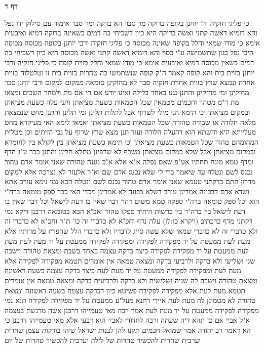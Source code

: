 \documentclass[12pt, openany]{book}
\newcommand{\sethebfont}{
\fontsize{10.5pt}{21.0pt} \selectfont
}
\newcommand{\twocol}[1]{
	{\sethebfont \begin{multicols}{2}
			#1
	\end{multicols}}	
}
\newcommand{\sectname}{}
\newcommand{\newsection}[1]{
	\addcontentsline{toc}{section}{#1}
	\renewcommand{\sectname}{#1}	
	\vspace{-\baselineskip}
	\begin{center}
		\textbf{%
\fontsize{16pt}{16pt}\selectfont
			#1}
	\end{center}
	\vspace{-\baselineskip}
	\nopagebreak
}
\begin{document}
\newsection{דף ד}
\twocol{כי פליגי חזקיה ור' יוחנן בקופה בדוקה  מר סבר  הא בדקה  ומר סבר  אימור עם סילוק ידו נפל 
והא דומיא דאשה קתני ואשה בדוקה היא  כיון דשכיחי בה דמים כשאינה בדוקה דמיא 
ואיבעית אימא  כי מודו שמאי והלל בקופה שאינה מכוסה כי פליגי חזקיה ורבי יוחנן בקופה מכוסה  מכוסה היכי נפל  כגון שתשמישה ע"י כסוי 
והא דומיא דאשה קתני ואשה מכוסה היא  כיון דשכיחי בה דמים כשאין מכוסה דמיא 
ואיבעית אימא  כי מודו שמאי והלל בזוית קופה כי פליגי חזקיה ורבי יוחנן בזוית בית  והא קופה קאמר 
ה"ק  קופה שנשתמשו בה טהרות בזוית בית זו וטלטלוה בזוית אחרת ונמצא שרץ בזוית אחרת  חזקיה סבר  לא מחזקינן טומאה ממקום למקום ורבי יוחנן סבר  מחזקינן 
ומי מחזקינן  והתנן  נגע באחד בלילה ואינו יודע אם חי אם מת ולמחר השכים ומצאו מת ר"מ מטהר
וחכמים מטמאין שכל הטמאות כשעת מציאתן 
ותני עלה  כשעת מציאתן ובמקום מציאתן 
וכי תימא  הני מילי לשרוף אבל לתלות תלינן  ומי תלינן 
והתנן  מחט שנמצאת מלאה חלודה או שבורה טהורה שכל הטמאות כשעת מציאתן  ואמאי  לימא  האי מעיקרא מחט מעלייתא היא והשתא הוא דהעלה חלודה 
ועוד תנן  מצא שרץ שרוף על גבי הזיתים וכן מטלית המהומהם טהור שכל הטמאות כשעת מציאתן 
וכי תימא  כשעת מציאתן בין לקולא בין לחומרא ובמקום מציאתן  אבל שלא במקום מציאתן משרף לא שרפינן מתלא תלינן
והתנן  ככר ע"ג הדף ומדף טמא מונח תחתיו אע"פ שאם נפלה א"א אלא א"כ נגעה טהורה שאני אומר  אדם טהור נכנס לשם ונטלה
עד שיאמר  ברי לי שלא נכנס אדם שם וא"ר אלעזר  לא נצרכה אלא למקום מדרון 
התם כדקתני טעמא
שאני אומר  אדם טהור נכנס לשם ונטלה 
הכא נמי  נימא עורב אתא ושדא  אדם דבכונה אמרינן עורב דשלא בכונה לא אמרינן 
מכדי האי ככר ספק טומאה ברה"י הוא וכל ספק טומאה ברה"י ספקה טמא  משום דהוי דבר שאין בו דעת לישאל וכל דבר שאין בו דעת לישאל בין ברה"ר בין ברשות היחיד ספקו טהור 
ואב"א  הכא בטומאה דרבנן  דיקא נמי דקתני מדף כדכתיב (ויקרא כו:לו) עלה נדף
וחכ"א  לא כדברי זה כו' ת"ר וחכ"א  לא כדברי זה ולא כדברי זה  לא כדברי שמאי שלא עשה סייג לדבריו ולא כדברי הלל שהפריז על מדותיו 
אלא  מעת לעת ממעטת על יד מפקידה לפקידה ומפקידה לפקידה ממעטת על יד מעת לעת 
מעת לעת ממעטת על יד מפקידה לפקידה כיצד  בדקה עצמה באחד בשבת ומצאת טהורה וישבה שני ושלישי ולא בדקה ולרביעי בדקה ומצאה טמאה אין אומרים תטמא מפקידה לפקידה אלא מעת לעת 
ומפקידה לפקידה ממעטת על יד מעת לעת כיצד  בדקה עצמה בשעה ראשונה ומצאת טהורה וישבה לה שניה ושלישית ולא בדקה ולרביעית בדקה ומצאה טמאה אין אומרים  תטמא מעת לעת אלא מפקידה לפקידה 
פשיטא כיון דבדקה עצמה בשעה ראשונה ומצאת טהורה לא מטמינן לה מעת לעת  איידי דתנא מעל"ע ממעטת על יד מפקידה לפקידה תנא נמי מפקידה לפקידה ממעטת על יד מעת לעת 
אמר רבה  מאי טעמייהו דרבנן אשה מרגשת בעצמה  א"ל אביי  אם כן תהא דיה שעתה  ורבה לחדודי לאביי הוא דבעי  אלא מאי טעמייהו דרבנן 
כי הא דאמר רב יהודה אמר שמואל  חכמים תקנו להן לבנות ישראל שיהו בודקות עצמן שחרית וערבית  שחרית להכשיר טהרות של לילה וערבית להכשיר טהרות של יום 
}
\end{document}
